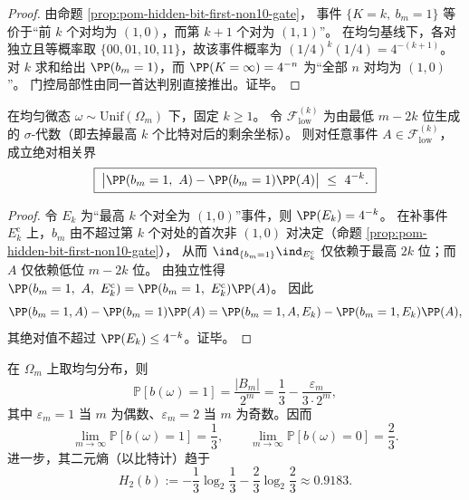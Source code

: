 \begin{proof}
由命题 \ref{prop:pom-hidden-bit-first-non10-gate}，
事件 \(\{K=k,\ b_m=1\}\) 等价于“前 \(k\) 个对均为 \((1,0)\)，而第 \(k+1\) 个对为 \((1,1)\)”。
在均匀基线下，各对独立且等概率取 \(\{00,01,10,11\}\)，故该事件概率为 \((1/4)^k(1/4)=4^{-(k+1)}\)。
对 \(k\) 求和给出 \(\PP(b_m=1)\)，而 \(\PP(K=\infty)=4^{-n}\) 为“全部 \(n\) 对均为 \((1,0)\)”。
门控局部性由同一首达判别直接推出。证毕。
\end{proof}

\begin{theorem}[隐藏位对远端信息的指数去耦合]\label{thm:pom-hidden-bit-exponential-decoupling-low-bits}
在均匀微态 \(\omega\sim\mathrm{Unif}(\Omega_m)\) 下，固定 \(k\ge 1\)。
令 \(\mathcal{F}^{(k)}_{\mathrm{low}}\) 为由最低 \(m-2k\) 位生成的 \(\sigma\)-代数（即去掉最高 \(k\) 个比特对后的剩余坐标）。
则对任意事件 \(A\in\mathcal{F}^{(k)}_{\mathrm{low}}\)，成立绝对相关界
\[
\boxed{\;
\bigl|\PP(b_m=1,\ A)-\PP(b_m=1)\PP(A)\bigr|\ \le\ 4^{-k}.\;}
\]
\end{theorem}

\begin{proof}
令 \(E_k\) 为“最高 \(k\) 个对全为 \((1,0)\)”事件，则 \(\PP(E_k)=4^{-k}\)。
在补事件 \(E_k^{\mathrm c}\) 上，\(b_m\) 由不超过第 \(k\) 个对处的首次非 \((1,0)\) 对决定（命题 \ref{prop:pom-hidden-bit-first-non10-gate}），
从而 \(\ind_{\{b_m=1\}}\ind_{E_k^{\mathrm c}}\) 仅依赖于最高 \(2k\) 位；而 \(A\) 仅依赖低位 \(m-2k\) 位。
由独立性得
\(
\PP(b_m=1,\ A,\ E_k^{\mathrm c})=\PP(b_m=1,\ E_k^{\mathrm c})\PP(A)
\)。
因此
\[
\PP(b_m=1,A)-\PP(b_m=1)\PP(A)
=\PP(b_m=1,A,E_k)-\PP(b_m=1,E_k)\PP(A),
\]
其绝对值不超过 \(\PP(E_k)\le 4^{-k}\)。证毕。
\end{proof}

\begin{corollary}\label{cor:pom-hidden-bit-entropy}
在 $\Omega_m$ 上取均匀分布，则
$$
\mathbb{P}[b(\omega)=1]=\frac{|B_m|}{2^m}
=\frac{1}{3}-\frac{\varepsilon_m}{3\cdot 2^m},
$$
其中 $\varepsilon_m=1$ 当 $m$ 为偶数、$\varepsilon_m=2$ 当 $m$ 为奇数。因而
$$
\lim_{m\to\infty}\mathbb{P}[b(\omega)=1]=\frac{1}{3},\qquad
\lim_{m\to\infty}\mathbb{P}[b(\omega)=0]=\frac{2}{3}.
$$
进一步，其二元熵（以比特计）趋于
$$
H_2(b)
:=-\frac{1}{3}\log_2\frac{1}{3}-\frac{2}{3}\log_2\frac{2}{3}
\approx 0.9183.
$$
\end{corollary}
